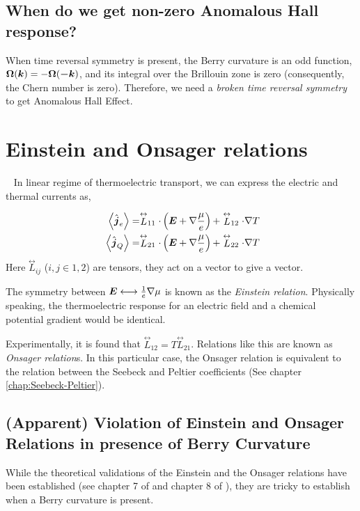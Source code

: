 \documentclass{report}
\renewcommand\vec[1]{\ensuremath\boldsymbol{#1}} %
\begin{document}
\subsection{When do we get non-zero Anomalous Hall response?}
When time reversal symmetry is present, the Berry curvature is an odd function, $\vec{\Omega}(\vec{k}) = - \vec{\Omega}(\vec{-k})$, and its integral over the Brillouin zone is zero (consequently, the Chern number is zero).
Therefore, we need a \textit{broken time reversal symmetry} to get Anomalous Hall Effect.


\section{Einstein and Onsager relations}~\label{sec:Einstein-Onsager}
In linear regime of thermoelectric transport, we 
can express the electric and thermal currents as,

\begin{equation}~\label{Eq:TrasportCoeffs}
	\begin{aligned}
		\expval{\hat{\vec{j}}_e} &= \stackrel{\leftrightarrow}{L}_{11} \cdot \left(\vec{E} + \nabla \frac{\mu}{e}\right) + \stackrel{\leftrightarrow}{L}_{12} \cdot \nabla{T}  \\
		\expval{\hat{\vec{j}}_Q} &= \stackrel{\leftrightarrow}{L}_{21} \cdot \left(\vec{E} + \nabla \frac{\mu}{e}\right)  + \stackrel{\leftrightarrow}{L}_{22} \cdot \nabla{T} 
	\end{aligned}
\end{equation}
Here $\stackrel{\leftrightarrow}{L}_{i j}$ ($i,j \in {1,2}$) are tensors, they act on a vector to give a vector.

The symmetry between $\vec{E} \longleftrightarrow \frac{1}{e}\nabla \mu$ is known as the \textit{Einstein relation}. Physically speaking, the thermoelectric response for an electric field and a chemical potential gradient would be identical.

Experimentally, it is found that $\stackrel{\leftrightarrow}{L}_{12} = T \stackrel{\leftrightarrow}{L}_{21}$. Relations like this are known as \textit{Onsager relation}s. In this particular case, the Onsager relation is equivalent to the relation between the Seebeck and Peltier coefficients (See chapter \ref{chap:Seebeck-Peltier}).

\subsection{(Apparent) Violation of Einstein and Onsager Relations in presence of Berry Curvature}
While the theoretical validations of the Einstein and the Onsager relations have been established (see chapter 7 of \cite{book:ZimanSolidState} and chapter 8 of \cite{book:AshcroftMermin76}), they are tricky to establish when a Berry curvature is present.
\end{document}
